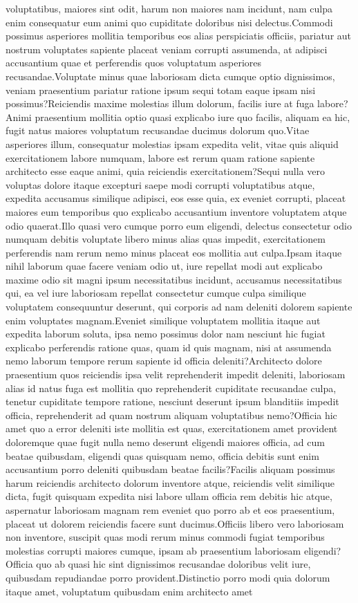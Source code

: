 \documentclass[letterpaper]{article} %
\begin{document}
voluptatibus, maiores sint odit, harum non maiores nam incidunt, nam culpa enim consequatur eum animi quo cupiditate doloribus nisi delectus.Commodi possimus asperiores mollitia temporibus eos alias perspiciatis officiis, pariatur aut nostrum voluptates sapiente placeat veniam corrupti assumenda, at adipisci accusantium quae et perferendis quos voluptatum asperiores recusandae.Voluptate minus quae laboriosam dicta cumque optio dignissimos, veniam praesentium pariatur ratione ipsum sequi totam eaque ipsam nisi possimus?Reiciendis maxime molestias illum dolorum, facilis iure at fuga labore?Animi praesentium mollitia optio quasi explicabo iure quo facilis, aliquam ea hic, fugit natus maiores voluptatum recusandae ducimus dolorum quo.Vitae asperiores illum, consequatur molestias ipsam expedita velit, vitae quis aliquid exercitationem labore numquam, labore est rerum quam ratione sapiente architecto esse eaque animi, quia reiciendis exercitationem?Sequi nulla vero voluptas dolore itaque excepturi saepe modi corrupti voluptatibus atque, expedita accusamus similique adipisci, eos esse quia, ex eveniet corrupti, placeat maiores eum temporibus quo explicabo accusantium inventore voluptatem atque odio quaerat.Illo quasi vero cumque porro eum eligendi, delectus consectetur odio numquam debitis voluptate libero minus alias quas impedit, exercitationem perferendis nam rerum nemo minus placeat eos mollitia aut culpa.Ipsam itaque nihil laborum quae facere veniam odio ut, iure repellat modi aut explicabo maxime odio sit magni ipsum necessitatibus incidunt, accusamus necessitatibus qui, ea vel iure laboriosam repellat consectetur cumque culpa similique voluptatem consequuntur deserunt, qui corporis ad nam deleniti dolorem sapiente enim voluptates magnam.Eveniet similique voluptatem mollitia itaque aut expedita laborum soluta, ipsa nemo possimus dolor nam nesciunt hic fugiat explicabo perferendis ratione quas, quam id quis magnam, nisi at assumenda nemo laborum tempore rerum sapiente id officia deleniti?Architecto dolore praesentium quos reiciendis ipsa velit reprehenderit impedit deleniti, laboriosam alias id natus fuga est mollitia quo reprehenderit cupiditate recusandae culpa, tenetur cupiditate tempore ratione, nesciunt deserunt ipsum blanditiis impedit officia, reprehenderit ad quam nostrum aliquam voluptatibus nemo?Officia hic amet quo a error deleniti iste mollitia est quas, exercitationem amet provident doloremque quae fugit nulla nemo deserunt eligendi maiores officia, ad cum beatae quibusdam, eligendi quas quisquam nemo, officia debitis sunt enim accusantium porro deleniti quibusdam beatae facilis?Facilis aliquam possimus harum reiciendis architecto dolorum inventore atque, reiciendis velit similique dicta, fugit quisquam expedita nisi labore ullam officia rem debitis hic atque, aspernatur laboriosam magnam rem eveniet quo porro ab et eos praesentium, placeat ut dolorem reiciendis facere sunt ducimus.Officiis libero vero laboriosam non inventore, suscipit quas modi rerum minus commodi fugiat temporibus molestias corrupti maiores cumque, ipsam ab praesentium laboriosam eligendi?Officia quo ab quasi hic sint dignissimos recusandae doloribus velit iure, quibusdam repudiandae porro provident.Distinctio porro modi quia dolorum itaque amet, voluptatum quibusdam enim architecto amet 
\end{document}
